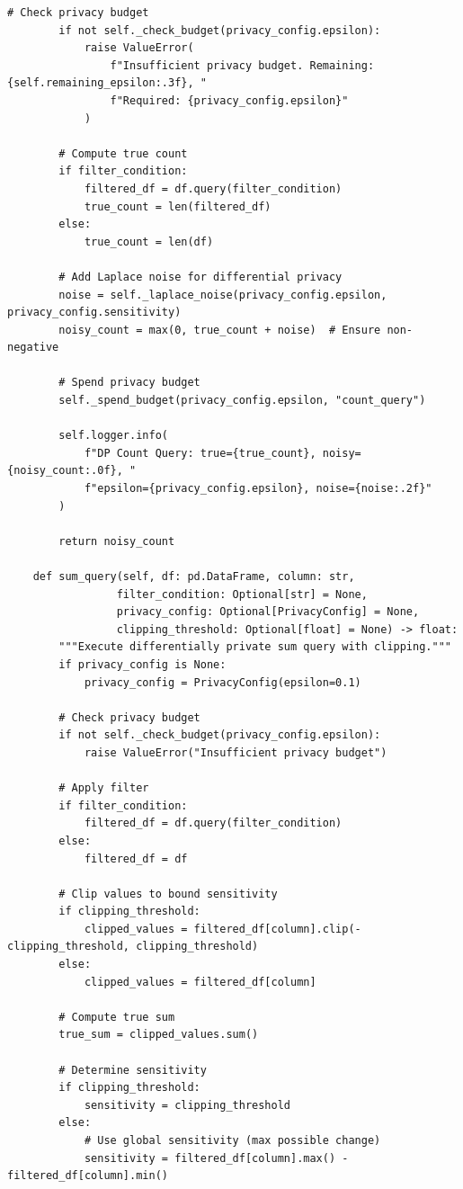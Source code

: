 \begin{lstlisting}[style=python, caption=PrivacyPreservingPipeline with Differential Privacy]
        # Check privacy budget
        if not self._check_budget(privacy_config.epsilon):
            raise ValueError(
                f"Insufficient privacy budget. Remaining: {self.remaining_epsilon:.3f}, "
                f"Required: {privacy_config.epsilon}"
            )

        # Compute true count
        if filter_condition:
            filtered_df = df.query(filter_condition)
            true_count = len(filtered_df)
        else:
            true_count = len(df)

        # Add Laplace noise for differential privacy
        noise = self._laplace_noise(privacy_config.epsilon, privacy_config.sensitivity)
        noisy_count = max(0, true_count + noise)  # Ensure non-negative

        # Spend privacy budget
        self._spend_budget(privacy_config.epsilon, "count_query")

        self.logger.info(
            f"DP Count Query: true={true_count}, noisy={noisy_count:.0f}, "
            f"epsilon={privacy_config.epsilon}, noise={noise:.2f}"
        )

        return noisy_count

    def sum_query(self, df: pd.DataFrame, column: str,
                 filter_condition: Optional[str] = None,
                 privacy_config: Optional[PrivacyConfig] = None,
                 clipping_threshold: Optional[float] = None) -> float:
        """Execute differentially private sum query with clipping."""
        if privacy_config is None:
            privacy_config = PrivacyConfig(epsilon=0.1)

        # Check privacy budget
        if not self._check_budget(privacy_config.epsilon):
            raise ValueError("Insufficient privacy budget")

        # Apply filter
        if filter_condition:
            filtered_df = df.query(filter_condition)
        else:
            filtered_df = df

        # Clip values to bound sensitivity
        if clipping_threshold:
            clipped_values = filtered_df[column].clip(-clipping_threshold, clipping_threshold)
        else:
            clipped_values = filtered_df[column]

        # Compute true sum
        true_sum = clipped_values.sum()

        # Determine sensitivity
        if clipping_threshold:
            sensitivity = clipping_threshold
        else:
            # Use global sensitivity (max possible change)
            sensitivity = filtered_df[column].max() - filtered_df[column].min()


\end{lstlisting}
